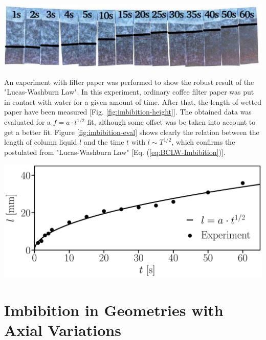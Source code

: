 \documentclass[aip, amsmath, amssymb, reprint, twocolumn, floatfix]{revtex4-1}
\begin{document}
\begin{center}
	\captionsetup{type=figure}
	\includegraphics[width = \linewidth]{../pictures/experiments/filter-paper_water_1s-60s_backlight.pdf}
	\label{fig:imbibition-height}
\end{center}

An experiment with filter paper \cite{Dullien1991} was performed to show the robust result of the "Lucas-Washburn Law". In this experiment, ordinary coffee filter paper was put in contact with water for a given amount of time. After that, the length of wetted paper have been measured [Fig. \ref{fig:imbibition-height}]. The obtained data was evaluated for a $f = a \cdot t^{1/2}$ fit, although some offset was be taken into account to get a better fit. Figure \ref{fig:imbibition-eval} shows clearly the relation between the length of column liquid $l$ and the time $t$ with $l \sim T^{1/2}$, which confirms the postulated from "Lucas-Washburn Law" [Eq. (\ref{eq:BCLW-Imbibition})]. 

\begin{center}
	\captionsetup{type=figure}
	\includegraphics[width = \linewidth]{../pictures/experiments/filter-paper_water_1s-60s_eval_origin-offset.pdf}
	\label{fig:imbibition-eval}
\end{center}

\section{Imbibition in Geometries with Axial Variations}
\label{sec:geometry}
\end{document}
